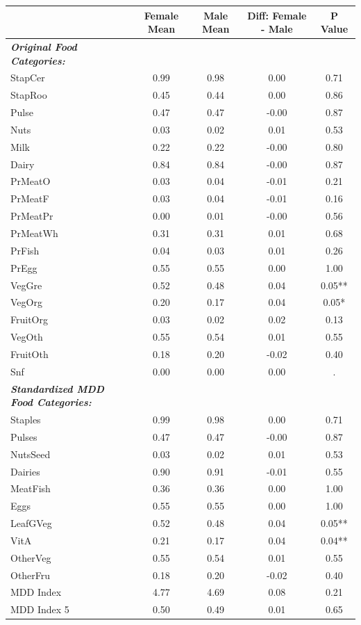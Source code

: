 {
\def\sym#1{\ifmmode^{#1}\else\(^{#1}\)\fi}
\begin{tabular}{l*{1}{cccc}}
\hline\hline
&     Female Mean&   Male Mean&Diff: Female - Male&     P Value\\
\hline
\textbf{\textit{Original Food Categories:}}&       &       &       &\\
StapCer     & 0.99  & 0.98  & 0.00  & 0.71 \\
StapRoo     & 0.45  & 0.44  & 0.00  & 0.86\\
	Pulse       & 0.47  & 0.47  & -0.00 & 0.87\\
	Nuts        & 0.03  & 0.02  & 0.01  & 0.53\\
	Milk        & 0.22  & 0.22  & -0.00 & 0.80\\
	Dairy       & 0.84  & 0.84  & -0.00 & 0.87\\
	PrMeatO     & 0.03  & 0.04  & -0.01 & 0.21\\
	PrMeatF     & 0.03  & 0.04  & -0.01 & 0.16\\
	PrMeatPr    & 0.00  & 0.01  & -0.00 & 0.56\\
	PrMeatWh    & 0.31  & 0.31  & 0.01  & 0.68\\
	PrFish      & 0.04  & 0.03  & 0.01  & 0.26\\
	PrEgg       & 0.55  & 0.55  & 0.00  & 1.00\\
	VegGre      & 0.52  & 0.48  & 0.04  & 0.05**\\
	VegOrg      & 0.20  & 0.17  & 0.04  & 0.05*\\
	FruitOrg    & 0.03  & 0.02  & 0.02  & 0.13\\
	VegOth      & 0.55  & 0.54  & 0.01  & 0.55\\
	FruitOth    & 0.18  & 0.20  & -0.02 & 0.40\\
	Snf         & 0.00  & 0.00  & 0.00  & . \\
	\textbf{\textit{Standardized MDD Food Categories:}}&       &       &       &\\
	Staples     & 0.99  & 0.98  & 0.00  & 0.71\\
	Pulses      & 0.47  & 0.47  & -0.00 & 0.87\\
	NutsSeed    & 0.03  & 0.02  & 0.01  & 0.53\\
	Dairies     & 0.90  & 0.91  & -0.01 & 0.55\\
	MeatFish    & 0.36  & 0.36  & 0.00  & 1.00\\
	Eggs        & 0.55  & 0.55  & 0.00  & 1.00\\
	LeafGVeg    & 0.52  & 0.48  & 0.04  & 0.05**\\
	VitA        & 0.21  & 0.17  & 0.04  & 0.04**\\
	OtherVeg    & 0.55  & 0.54  & 0.01  & 0.55\\
	OtherFru    & 0.18  & 0.20  & -0.02 & 0.40\\
	MDD Index   & 4.77  & 4.69  & 0.08  & 0.21\\
	MDD Index 5 & 0.50  & 0.49  & 0.01  & 0.65\\
\hline\hline
\end{tabular}
}

